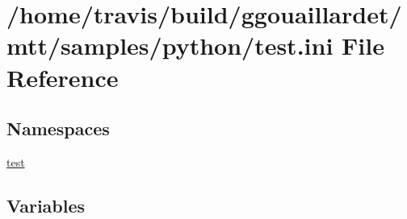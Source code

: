 \hypertarget{test_8ini}{\section{/home/travis/build/ggouaillardet/mtt/samples/python/test.ini File Reference}
\label{test_8ini}
}
\subsection*{Namespaces}
\begin{DoxyCompactItemize}
\item 
\hyperlink{namespacetest}{test}
\end{DoxyCompactItemize}
\subsection*{Variables}
